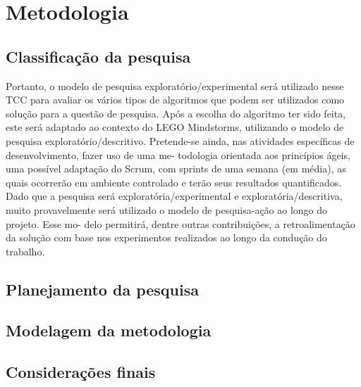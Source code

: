 \chapter{Metodologia}
\section{Classificação da pesquisa}
Portanto, o modelo de pesquisa exploratório/experimental será utilizado nesse
TCC para avaliar os vários tipos de algoritmos que podem ser utilizados como solução para
a questão de pesquisa. Após a escolha do algoritmo ter sido feita, este será adaptado ao
contexto do LEGO Mindstorms, utilizando o modelo de pesquisa exploratório/descritivo.
Pretende-se ainda, nas atividades específicas de desenvolvimento, fazer uso de uma me-
todologia orientada aos princípios ágeis, uma possível adaptação do Scrum, com sprints
de uma semana (em média), as quais ocorrerão em ambiente controlado e terão seus
resultados quantificados.
Dado que a pesquisa será exploratória/experimental e exploratória/descritiva, muito
provavelmente será utilizado o modelo de pesquisa-ação ao longo do projeto. Esse mo-
delo permitirá, dentre outras contribuições, a retroalimentação da solução com base nos
experimentos realizados ao longo da condução do trabalho.
\section{Planejamento da pesquisa}
\section{Modelagem da metodologia}
\section{Considerações finais}